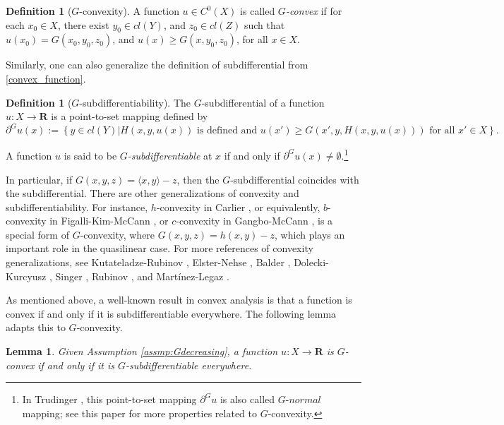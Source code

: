 \documentclass[a4paper, 11pt]{amsart}
\numberwithin{equation}{section}
\theoremstyle{plain}
\newtheorem{lemma}[theorem]{Lemma}
\theoremstyle{definition}
\newtheorem{definition}[theorem]{Definition}
\theoremstyle{remark}
\newcommand{\R}{\mathbf{R}}
\begin{document}
\begin{definition}[$G$-convexity]
	A function $u\in C^0(X)$ is called {\it $G$-convex} if for each $x_0 \in X$, there exist $y_0 \in   cl(Y)$, and $z_0 \in  cl(Z)$ such that $u(x_0)=G(x_0, y_0, z_0)$, and $u(x)\ge G(x, y_0, z_0)$, for all $x\in X$.
\end{definition}


Similarly, one can also generalize the definition of subdifferential from \eqref{convex_function}.

\begin{definition}[$G$-subdifferentiability]
	The $G$-subdifferential of a 
	function $u: X \longrightarrow \R$ is a point-to-set mapping defined by
	\begin{equation*}
	\partial^G u(x):= \left\{ y\in  cl(Y)| H(x,y,u(x)) \text{ is defined and }u(x')\ge G(x',y, H(x,y,u(x))) \text{ for all } x'\in X \right\}.
	\end{equation*}
	
	A function $u$ is said to be {\it $G$-subdifferentiable} at $x$ if and only if $\partial^G u(x) \neq \emptyset$.\footnote{In Trudinger \cite{Trudinger14}, this point-to-set mapping $\partial^G u$ is also called $G$-$normal$ mapping; see this paper for more properties related to $G$-convexity.}
\end{definition}




In particular, if $G(x,y,z) = \langle x, y \rangle - z$, then the $G$-subdifferential coincides with the subdifferential. There are other generalizations of convexity and subdifferentiability. For instance, $h$-convexity in Carlier \cite{Carlier01}, or equivalently, $b$-convexity in Figalli-Kim-McCann \cite{FigalliKimMcCann11}, or $c$-convexity in  Gangbo-McCann \cite{GangboMcCann96}, is a special form of $G$-convexity, where $G(x,y,z)=  h(x,y) -z$, which plays an important role in the quasilinear case. For more references of convexity generalizations, see Kutateladze-Rubinov \cite{KutateladzeRubinov72}, Elster-Nehse \cite{ElsterNehse74}, Balder \cite{Balder77}, Dolecki-Kurcyusz \cite{DoleckiKurcyusz78},  Singer \cite{Singer97},  Rubinov \cite{Rubinov00a}, and Martínez-Legaz \cite{MartinezLegaz05}.\medskip


As mentioned above, a well-known result in convex analysis is that a function is convex if and only if it is subdifferentiable everywhere. The following lemma adapts this to $G$-convexity. 

\begin{lemma}\label{convex-subdiff}
	Given Assumption \ref{assmp:Gdecreasing}, a function $u: X \longrightarrow \R$ is $G$-convex if and only if it is $G$-subdifferentiable everywhere.
\end{lemma}
\end{document}
